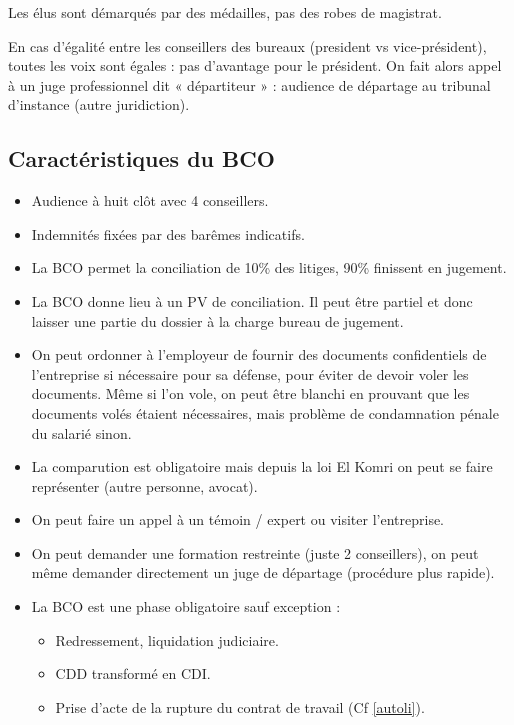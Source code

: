 	Les élus sont démarqués par des médailles, pas des robes de magistrat.
	
	En cas d'égalité entre les conseillers des bureaux (president vs vice-président), toutes les voix sont égales : pas d’avantage pour le président. On fait alors appel à un juge professionnel dit « départiteur » : audience de départage au tribunal d’instance (autre juridiction).


\subsection{Caractéristiques du BCO}

	\begin{itemize}
		\item[\textbullet] Audience à huit clôt avec 4 conseillers.
		\item[\textbullet] Indemnités fixées par des barêmes indicatifs.
		\item[\textbullet] La BCO permet la conciliation de 10\% des litiges, 90\% finissent en jugement.
		\item[\textbullet] La BCO donne lieu à un PV de conciliation.
			Il peut être partiel et donc laisser une partie du dossier à la charge bureau de jugement.
		\item[\textbullet] On peut ordonner à l’employeur de fournir des documents confidentiels de l’entreprise si nécessaire pour sa défense, pour éviter de devoir voler les documents.
			Même si l’on vole, on peut être blanchi en prouvant que les documents volés étaient nécessaires, mais problème de condamnation pénale du salarié sinon.
		\item[\textbullet] La comparution est obligatoire mais depuis la loi El Komri on peut se faire représenter (autre personne, avocat).
		\item[\textbullet] On peut faire un appel à un témoin / expert ou visiter l'entreprise.
		\item[\textbullet] On peut demander une formation restreinte (juste 2 conseillers), on peut même demander directement un juge de départage (procédure plus rapide).
		\item[\textbullet] La BCO est une phase obligatoire sauf exception :
			\begin{itemize}
				\item[\textopenbullet] Redressement, liquidation judiciaire.
				\item[\textopenbullet] CDD transformé en CDI.
				\item[\textopenbullet] Prise d’acte de la rupture du contrat de travail (Cf \ref{autoli}).
			\end{itemize}
	\end{itemize}

